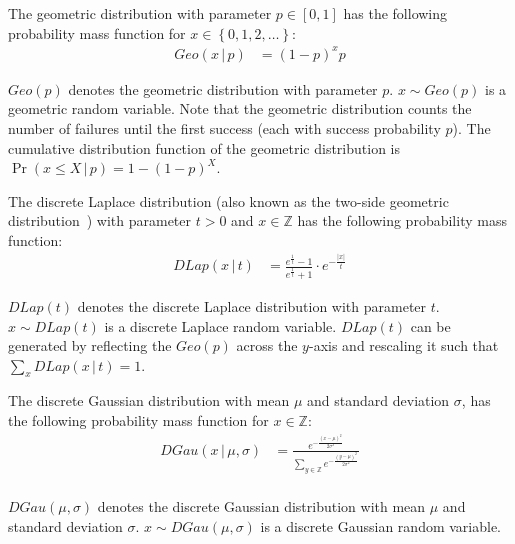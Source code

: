 \begin{definition}
    \label{def:GeometricDistribution}
    The geometric distribution with parameter $p \in \left[0,1\right] $ has the following probability mass function for $x\in \left\{0,1,2,\ldots\right\} $:
    \begin{equation}
        \begin{split}
            Geo \left( x \,|\, p \right) &=\left(1-p\right)^{x}p
        \end{split}
    \end{equation}
\end{definition}
$Geo \left(  p \right)$ denotes the geometric distribution with parameter $p$.
$x \sim Geo \left(  p \right)$ is a geometric random variable.
Note that the geometric distribution counts the number of failures until the first success (each with success probability $p$).
The cumulative distribution function of the geometric distribution is $\Pr\left(x\leq X \,|\,p\right) =1-\left(1-p\right)^X $.


\begin{definition}
    \label{def:DiscreteLaplaceDistribution}
    The discrete Laplace distribution (also known as the two-side geometric distribution~\cite{ghosh2012universally}) with parameter $t>0$ and $x \in \mathbb{Z}$ has the following probability mass function:
    \begin{equation}
        \begin{split}
            DLap \left(x \,|\,t\right)&= \frac{e^{\frac{1}{t}}-1}{e^{\frac{1}{t}}+1} \cdot e^{- \frac{\left\lvert x\right\rvert }{t} }
        \end{split}
    \end{equation}
\end{definition}
$DLap \left(t\right)$ denotes the discrete Laplace distribution with parameter $t$.
$x \sim DLap \left(  t \right)$ is a discrete Laplace random variable.
$DLap\left(t\right)$ can be generated by reflecting the $Geo\left(p\right) $ across the $y$-axis and rescaling it such that $\sum_x DLap\left(x\, | \,t\right)=1$.


\begin{definition}
    \label{def:DiscreteGaussianDistribution}
    The discrete Gaussian distribution with mean $\mu$ and standard deviation $\sigma$, has the following probability mass function for $x\in \mathbb{Z}$:
    \begin{equation}
        \begin{split}
            DGau \left(x \,|\,\mu,\sigma\right)&=\frac{e^{-\frac{\left(x-\mu\right)^2}{2 \sigma^2}} }{\sum_{y\in \mathbb{Z}} e^{-\frac{\left(y-\mu\right)^2}{2 \sigma^2}}}\\
        \end{split}
    \end{equation}
\end{definition}
$DGau \left(\mu,\sigma\right)$ denotes the discrete Gaussian distribution with mean $\mu$ and standard deviation $\sigma$.
$x \sim DGau \left(\mu,\sigma\right)$ is a discrete Gaussian random variable.




